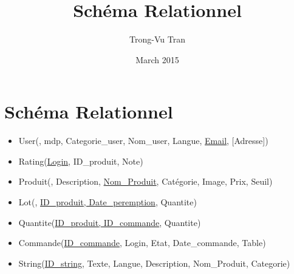 \documentclass{article}
\title{Schéma Relationnel}
\author{Trong-Vu Tran}
\date{March 2015}
\begin{document}
\maketitle

\section{Schéma Relationnel}

\begin{itemize}

\item User(, mdp, Categorie\_user, Nom\_user, Langue, \uline{Email}, [Adresse])
\item Rating(\uline{Login}, ID\_produit, Note)
\item Produit(, Description, \uline{Nom\_Produit}, Catégorie, Image, Prix, Seuil)
\item Lot(, \uline{ID\_produit, Date\_peremption}, Quantite)
\item Quantite(\uline{ID\_produit, ID\_commande}, Quantite)
\item Commande(\uline{ID\_commande}, Login, Etat, Date\_commande, Table)
\item String(\uline{ID\_string}, Texte, Langue, Description, Nom\_Produit, Categorie)

\end{itemize}
\end{document}
